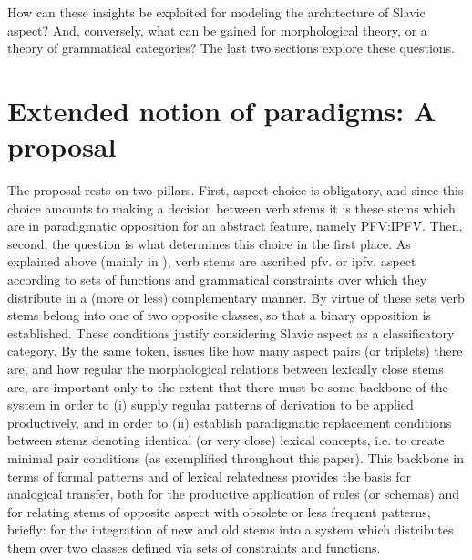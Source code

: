 \documentclass[output=paper]{langscibook}
\begin{document}
How can these insights be exploited for modeling the architecture of Slavic aspect? And, conversely, what can be gained for morphological theory, or a theory of grammatical categories? The last two sections explore these questions.

\section{Extended notion of paradigms: A proposal}\label{wiemer:5}

The proposal rests on two pillars. First, aspect choice is obligatory, and since this choice amounts to making a decision between verb stems it is these stems which are in paradigmatic opposition for an abstract feature, namely PFV:IPFV. Then, second, the question is what determines this choice in the first place. As explained above (mainly in ), verb stems are ascribed pfv. or ipfv. aspect according to sets of functions and grammatical constraints over which they distribute in a (more or less) complementary manner. By virtue of these sets verb stems belong into one of two opposite classes, so that a binary opposition is established. These conditions justify considering Slavic aspect as a classificatory category. By the same token, issues like how many aspect pairs (or triplets) there are, and how regular the morphological relations between lexically close stems are, are important only to the extent that there must be some backbone of the system in order to (i) supply regular patterns of derivation to be applied productively, and in order to (ii) establish paradigmatic replacement conditions between stems denoting identical (or very close) lexical concepts, i.e. to create minimal pair conditions (as exemplified throughout this paper). This backbone in terms of formal patterns and of lexical relatedness provides the basis for analogical transfer, both for the productive application of rules (or schemas) and for relating stems of opposite aspect with obsolete or less frequent patterns, briefly: for the integration of new and old stems into a system which distributes them over two classes defined via sets of constraints and functions.
\end{document}
